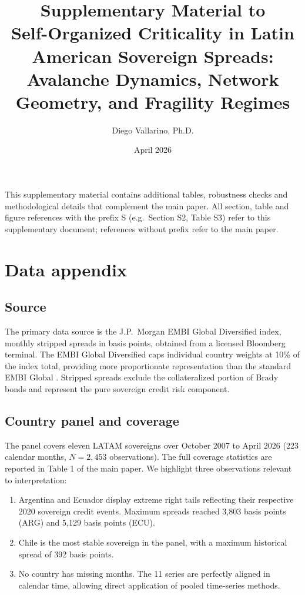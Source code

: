 \documentclass[11pt,a4paper]{article}
\title{Supplementary Material to\\
\textbf{Self-Organized Criticality in Latin American Sovereign Spreads:\\
Avalanche Dynamics, Network Geometry, and Fragility Regimes}}
\author{Diego Vallarino, Ph.D.}
\date{April 2026}
\begin{document}
\maketitle

\tableofcontents

\bigskip

\noindent This supplementary material contains additional tables, robustness
checks and methodological details that complement the main paper. All section,
table and figure references with the prefix S (e.g.\ Section S2, Table S3)
refer to this supplementary document; references without prefix refer to the
main paper.

\section{Data appendix}
\label{sec:data_appendix}

\subsection{Source}
The primary data source is the J.P.~Morgan EMBI Global Diversified index,
monthly stripped spreads in basis points, obtained from a licensed Bloomberg
terminal. The EMBI Global Diversified caps individual country weights at 10\%
of the index total, providing more proportionate representation than the
standard EMBI Global \citep{Longstaff2011}. Stripped spreads exclude the
collateralized portion of Brady bonds and represent the pure sovereign credit
risk component.

\subsection{Country panel and coverage}
The panel covers eleven LATAM sovereigns over October 2007 to April 2026
(223 calendar months, $N=2{,}453$ observations). The full coverage statistics
are reported in Table 1 of the main paper. We highlight three observations
relevant to interpretation:

\begin{enumerate}
\item Argentina and Ecuador display extreme right tails reflecting
their respective 2020 sovereign credit events. Maximum spreads reached
3{,}803 basis points (ARG) and 5{,}129 basis points (ECU).
\item Chile is the most stable sovereign in the panel, with a maximum
historical spread of 392 basis points.
\item No country has missing months. The 11 series are perfectly aligned in
calendar time, allowing direct application of pooled time-series
methods.
\end{enumerate}
\end{document}
